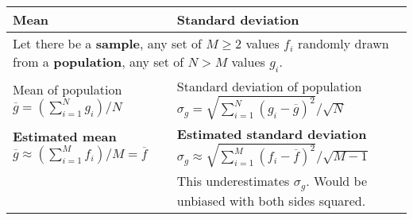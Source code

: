 \documentclass{article}
\begin{document}
\begin{minipage}[t][18cm][c]{13cm}
    
    \vfill
    \begin{tabular}{|m{}|m{}|}
        \hline
        \textbf{Mean}
        & \textbf{Standard deviation}\\
        \hline
        \multicolumn{2}{|m{0.8\textwidth}|}{
            \hspace{-0.6cm} Let there be a \textbf{sample}, any set of $M \geq 2$ values $f_i$ randomly drawn from a \textbf{population}, any set of $N>M$ values $g_i$.
        }\\
        \hline
        Mean of population\newline
        $\overline{g} = (\sum_{i=1}^N g_i)/N$ 
        &
        Standard deviation of population\newline
        $\sigma_g = \sqrt{\sum_{i=1}^N \left(g_i-\overline{g}\right)^2}/ \sqrt{N}$
        \\  
        \textbf{Estimated mean}\newline
        $\overline{g} \approx (\sum_{i=1}^M f_i)/M = \overline{f}$
        &
        \textbf{Estimated standard deviation}\newline
        $\sigma_g \approx \sqrt{\sum_{i=1}^M \left(f_i-\overline{f}\right)^2}/ \sqrt{M-1}$
        \\
        & 
        This underestimates $\sigma_g$. Would be unbiased with both sides squared.
        \\
        \hline
    \end{tabular}
    
    \vfill


\end{minipage}
\end{document}
